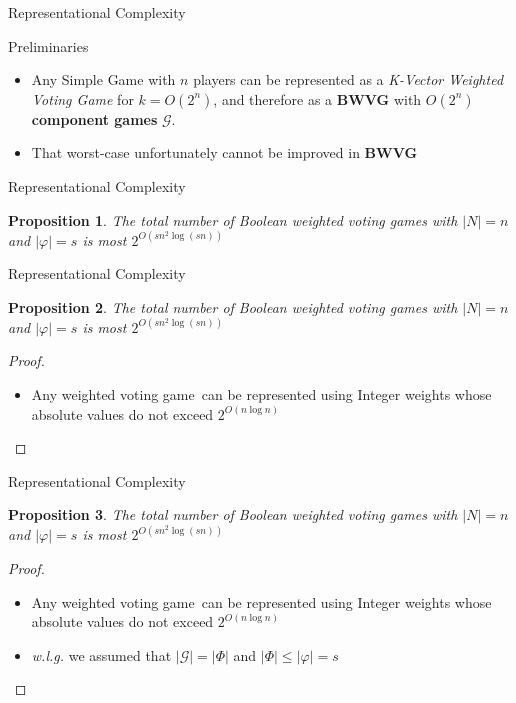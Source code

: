 \documentclass{beamer}
\begin{document}
\begin{frame}[fragile]{Representational Complexity}
  \begin{block}{Preliminaries}
    \begin{itemize}
      \item Any Simple Game with $n$ players can be represented as a \textit{K-Vector Weighted Voting Game}
      for $k = O(2^n)$, and therefore as a \textbf{BWVG} with $O(2^n)$ \textbf{component games} $\mathcal{G}$.
      \item That worst-case unfortunately cannot be improved in \textbf{BWVG}
    \end{itemize}
  \end{block}
\end{frame}

\begin{frame}[fragile]{Representational Complexity}
  \newtheorem{prop1}{Proposition}
  \begin{prop1}
    The total number of Boolean weighted voting games with $|N| = n$ and $|\varphi| = s$ is
    most $2^{O(sn^2 \log(sn))}$
  \end{prop1}
\end{frame}

\begin{frame}[fragile]{Representational Complexity}
  \begin{prop1}
    The total number of Boolean weighted voting games with $|N| = n$ and $|\varphi| = s$ is
    most $2^{O(sn^2 \log(sn))}$
  \end{prop1}
  \begin{proof}
    \begin{itemize}
      \item Any weighted voting game\footnotemark\ can be represented using Integer weights whose absolute values do not exceed $2^{O(n \log{n})}$
    \end{itemize}
  \end{proof}
\end{frame}

\begin{frame}[fragile]{Representational Complexity}
  \begin{prop1}
    The total number of Boolean weighted voting games with $|N| = n$ and $|\varphi| = s$ is
    most $2^{O(sn^2 \log(sn))}$
  \end{prop1}
  \begin{proof}
    \begin{itemize}
      \item Any weighted voting game\footnotemark\ can be represented using Integer weights whose absolute values do not exceed $2^{O(n \log{n})}$
      \item \textit{w.l.g.} we assumed that $|\mathcal{G}| = |\Phi|$ and $|\Phi| \leq |\varphi| = s$
    \end{itemize}
  \end{proof}
\end{frame}
\end{document}

